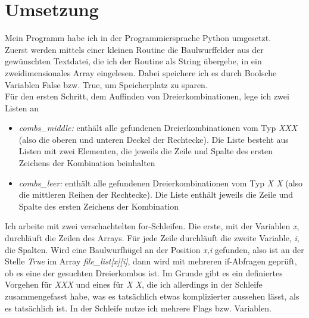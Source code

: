 \documentclass[a4paper,10pt,ngerman]{scrartcl}
\begin{document}
\section{Umsetzung}
Mein Programm habe ich in der Programmiersprache Python umgesetzt.\\Zuerst werden mittels einer kleinen Routine die Baulwurffelder aus der gewünschten Textdatei, die ich der Routine als String übergebe, in ein zweidimensionales Array eingelesen. Dabei speichere ich es durch Boolsche Variablen False bzw. True, um Speicherplatz zu sparen.\\Für den ersten Schritt, dem Auffinden von Dreierkombinationen, lege ich zwei Listen an
\begin{itemize}
    \item \textit{combs\_middle:} enthält alle gefundenen Dreierkombinationen vom Typ \textit{XXX}  (also die oberen und unteren Deckel der Rechtecke). Die Liste besteht aus Listen mit zwei Elementen, die jeweils die Zeile und Spalte des ersten Zeichens der Kombination beinhalten
    \item \textit{combs\_leer:} enthält alle gefundenen Dreierkombinationen vom Typ \textit{X X} (also die mittleren Reihen der Rechtecke). Die Liste enthält jeweils die Zeile und Spalte des ersten Zeichens der Kombination
\end{itemize}
Ich arbeite mit zwei verschachtelten for-Schleifen. Die erste, mit der Variablen \textit{x}, durchläuft die Zeilen des Arrays. Für jede Zeile durchläuft die zweite Variable, \textit{i}, die Spalten. Wird eine Baulwurfhügel an der Position \textit{x,i} gefunden, also ist an der Stelle \textit{True} im Array \textit{file\_list[x][i]}, dann wird mit mehreren if-Abfragen geprüft, ob es eine der gesuchten Dreierkombos ist. Im Grunde gibt es ein definiertes Vorgehen für \textit{XXX} und eines für \textit{X X}, die ich allerdings in der Schleife zusammengefasst habe, was es tatsächlich etwas komplizierter aussehen lässt, als es tatsächlich ist. In der Schleife nutze ich mehrere Flags bzw. Variablen. 
\end{document}
